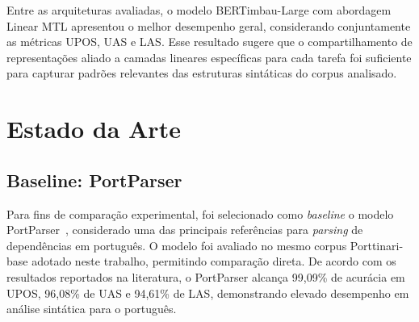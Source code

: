 Entre as arquiteturas avaliadas, o modelo BERTimbau-Large com abordagem Linear MTL apresentou
o melhor desempenho geral, considerando conjuntamente as métricas UPOS, UAS e LAS. Esse
resultado sugere que o compartilhamento de representações aliado a camadas lineares específicas
para cada tarefa foi suficiente para capturar padrões relevantes das estruturas sintáticas do
corpus analisado.

\section{Estado da Arte}

\subsection*{Baseline: PortParser}

Para fins de comparação experimental, foi selecionado como \textit{baseline} o modelo
PortParser~\citep{lopes2024towards}, considerado uma das principais referências para
\textit{parsing} de dependências em português. O modelo foi avaliado no mesmo corpus Porttinari-base
adotado neste trabalho, permitindo comparação direta. De acordo com os resultados reportados
na literatura, o PortParser alcança 99,09\% de acurácia em UPOS, 96,08\% de UAS e 94,61\% de
LAS, demonstrando elevado desempenho em análise sintática para o português.
